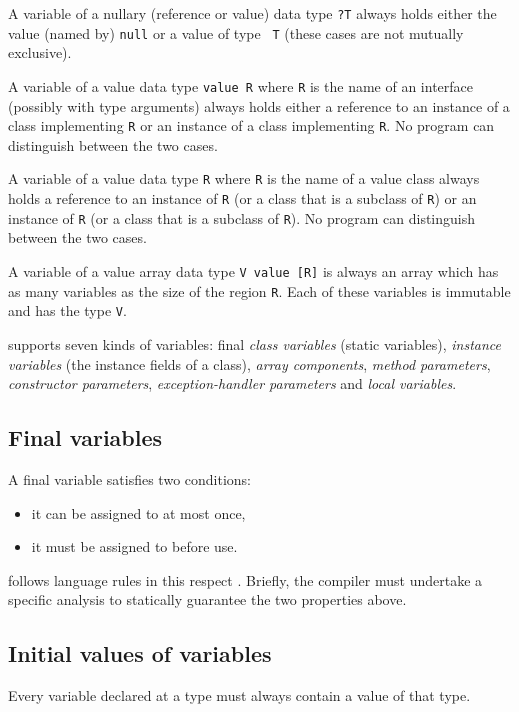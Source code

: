 A variable of a nullary (reference or value) data type {\tt ?T} always
holds either the value (named by) {\tt null} or a value of type {\tt
T} (these cases are not mutually exclusive).

A variable of a value data type {\tt value R} where {\tt R} is the
name of an interface (possibly with type arguments) always holds
either a reference to an instance of a class implementing {\tt R} or
an instance of a class implementing {\tt R}. No program can
distinguish between the two cases.

A variable of a value data type {\tt R} where {\tt R} is the name of a
value class always holds a reference to an instance of {\tt R} (or a
class that is a subclass of {\tt R}) or an instance of {\tt R} (or a
class that is a subclass of {\tt R}). No program can distinguish
between the two cases.

A variable of a value array data type {\tt V value [R]} is always an
array which has as many variables as the size of the region {\tt R}.
Each of these variables is immutable and has the type {\tt V}.

\Xten{} supports seven kinds of variables: final {\em class
variables} (static variables), {\em instance variables} (the instance
fields of a class), {\em array components}, {\em method parameters},
{\em constructor parameters}, {\em exception-handler parameters} and
{\em local variables}.

\subsection{Final variables}\label{FinalVariable}
A final variable satisfies two conditions: 
\begin{itemize}
\item it can be assigned to at most once, 
\item it must be assigned to before use. 
\end{itemize}

\Xten{} follows \java{} language rules in this respect \cite[\S
4.5.4,8.3.1.2,16]{jls2}. Briefly, the compiler must undertake a
specific analysis to statically guarantee the two properties above.


\subsection{Initial values of variables}
\label{NullaryConstructor}
\cbstart 
Every variable declared at a type must always contain a value of that type.

